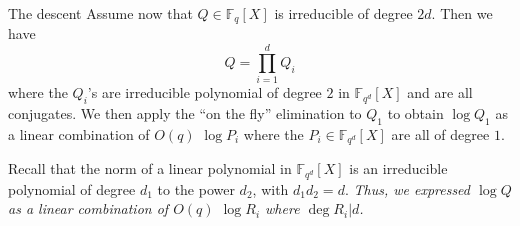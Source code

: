 \documentclass[xcolor=x11names,compress]{beamer}
\theoremstyle{break}
\theoremstyle{sc}
\theoremstyle{definition}
\theoremstyle{remark}
\begin{document}
\begin{frame}{The descent}
  Assume now that $Q\in\mathbb{F}_{q}[X]$ is irreducible of degree $2d$. Then we
  have
  \[
    Q=\prod_{i=1}^d Q_i
  \]
  where the $Q_i$'s are irreducible polynomial of degree $2$ in
  $\mathbb{F}_{q^d}[X]$ and are all conjugates. We then apply the ``on the fly''
  elimination to $Q_1$ to obtain $\log Q_1$ as a linear combination of 
  $O(q)$ $\log P_i$ where the $P_i\in \mathbb{F}_{q^d}[X]$ are all of degree $1$.
  
  Recall that the norm of a linear polynomial in $\mathbb{F}_{q^d}[X]$ is an irreducible
  polynomial of degree $d_1$ to the power $d_2$, with $d_1d_2 = d$.
  \emph{Thus, we expressed $\log Q$ as a linear combination of $O(q)$ $\log
  R_i$ where $\deg R_i | d$.}
\end{frame}

\end{document}
